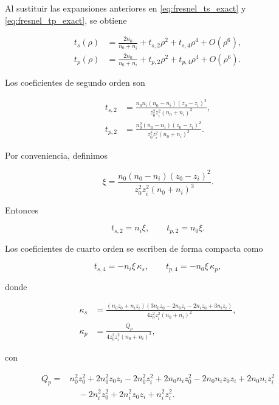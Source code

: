 Al sustituir las expansiones anteriores en \eqref{eq:fresnel_ts_exact} y \eqref{eq:fresnel_tp_exact}, se obtiene

\begin{align}
t_s(\rho)
&=
\frac{2n_0}{n_0+n_i}
+
t_{s,2}\rho^2
+
t_{s,4}\rho^4
+
O(\rho^6),
\label{eq:fresnel_ts_series_general}
\\[6pt]
t_p(\rho)
&=
\frac{2n_0}{n_0+n_i}
+
t_{p,2}\rho^2
+
t_{p,4}\rho^4
+
O(\rho^6).
\label{eq:fresnel_tp_series_general}
\end{align}

Los coeficientes de segundo orden son

\begin{align}
t_{s,2}
&=
\frac{
n_0n_i(n_0-n_i)(z_0-z_i)^2
}{
z_0^2z_i^2(n_0+n_i)^3
},
\label{eq:ts2_coefficient}
\\[6pt]
t_{p,2}
&=
\frac{
n_0^2(n_0-n_i)(z_0-z_i)^2
}{
z_0^2z_i^2(n_0+n_i)^3
}.
\label{eq:tp2_coefficient}
\end{align}

Por conveniencia, definimos

\begin{equation}
\xi
=
\frac{
n_0(n_0-n_i)(z_0-z_i)^2
}{
z_0^2z_i^2(n_0+n_i)^3
}.
\label{eq:xi_definition_fresnel_series}
\end{equation}

Entonces

\begin{equation}
t_{s,2}=n_i\xi,
\qquad
t_{p,2}=n_0\xi.
\label{eq:ts2_tp2_xi_form}
\end{equation}

Los coeficientes de cuarto orden se escriben de forma compacta como

\begin{equation}
t_{s,4}
=
-n_i\xi\,\kappa_s,
\qquad
t_{p,4}
=
-n_0\xi\,\kappa_p,
\label{eq:ts4_tp4_kappa_form}
\end{equation}

donde

\begin{align}
\kappa_s
&=
\frac{
(n_0z_0+n_iz_i)
(3n_0z_0-2n_0z_i-2n_iz_0+3n_iz_i)
}{
4z_0^2z_i^2(n_0+n_i)^2
},
\label{eq:kappa_s_definition}
\\[8pt]
\kappa_p
&=
\frac{
Q_p
}{
4z_0^2z_i^2(n_0+n_i)^2
},
\label{eq:kappa_p_definition}
\end{align}

con

\begin{align}
Q_p
={}&
n_0^2z_0^2
+
2n_0^2z_0z_i
-
2n_0^2z_i^2
+
2n_0n_iz_0^2
-
2n_0n_iz_0z_i
+
2n_0n_iz_i^2
\nonumber
\\
&\quad
-
2n_i^2z_0^2
+
2n_i^2z_0z_i
+
n_i^2z_i^2.
\label{eq:Qp_definition}
\end{align}

